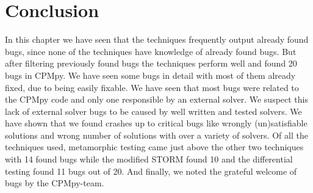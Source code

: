 


\section{Conclusion}
\label{res:conclusion}
In this chapter we have seen that the techniques frequently output already found bugs, since none of the techniques have knowledge of already found bugs. But after filtering previously found bugs the techniques perform well and found 20 bugs in CPMpy. We have seen some bugs in detail with most of them already fixed, due to being easily fixable. We have seen that most bugs were related to the CPMpy code and only one responsible by an external solver. We suspect this lack of external solver bugs to be caused by well written and tested solvers. We have shown that we found crashes up to critical bugs like wrongly (un)satisfiable solutions and wrong number of solutions with over a variety of solvers. Of all the techniques used, metamorphic testing came just above the other two techniques with 14 found bugs while the modified STORM found 10 and the differential testing found 11 bugs out of 20. And finally, we noted the grateful welcome of bugs by the CPMpy-team.

